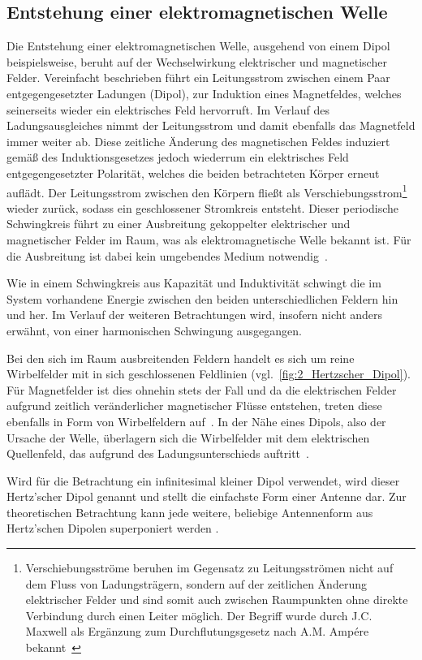 
\subsection{Entstehung einer elektromagnetischen Welle}\label{cha:2_sub_Entstehung_einer_Welle}

Die Entstehung einer elektromagnetischen Welle, ausgehend von einem Dipol beispielsweise, beruht auf der Wechselwirkung elektrischer und magnetischer Felder. Vereinfacht beschrieben führt ein Leitungsstrom zwischen einem Paar entgegengesetzter Ladungen (Dipol), zur Induktion eines Magnetfeldes, welches seinerseits wieder ein elektrisches Feld hervorruft. Im Verlauf des Ladungsausgleiches nimmt der Leitungsstrom und damit ebenfalls das Magnetfeld immer weiter ab. Diese zeitliche Änderung des magnetischen Feldes induziert gemäß des Induktionsgesetzes jedoch wiederrum ein elektrisches Feld entgegengesetzter Polarität, welches die beiden betrachteten Körper erneut auflädt. Der Leitungsstrom zwischen den Körpern fließt als Verschiebungsstrom\footnote{Verschiebungsströme beruhen im Gegensatz zu Leitungsströmen nicht auf dem Fluss von Ladungsträgern, sondern auf der zeitlichen Änderung elektrischer Felder und sind somit auch zwischen Raumpunkten ohne direkte Verbindung durch einen Leiter möglich. Der Begriff wurde durch J.C. Maxwell als Ergänzung zum Durchflutungsgesetz nach A.M. Ampére bekannt~\cite{Feldtheorie_Begriffe}} wieder zurück, sodass ein geschlossener Stromkreis entsteht. Dieser periodische Schwingkreis führt zu einer Ausbreitung gekoppelter elektrischer und magnetischer Felder im Raum, was als elektromagnetische Welle bekannt ist. Für die Ausbreitung ist dabei kein umgebendes Medium notwendig~\cite{EM_Schirmung}.
\par
\vspace{\linespace}
Wie in einem Schwingkreis aus Kapazität und Induktivität schwingt die im System vorhandene Energie zwischen den beiden unterschiedlichen Feldern hin und her. Im Verlauf der weiteren Betrachtungen wird, insofern nicht anders erwähnt, von einer harmonischen Schwingung ausgegangen.
\par
\vspace{\linespace}
Bei den sich im Raum ausbreitenden Feldern handelt es sich um reine Wirbelfelder mit in sich geschlossenen Feldlinien \cite{Feldtheorie_Begriffe} (vgl.~\Abb\ref{fig:2_Hertzscher_Dipol}). Für Magnetfelder ist dies ohnehin stets der Fall und da die elektrischen Felder aufgrund zeitlich veränderlicher magnetischer Flüsse entstehen, treten diese ebenfalls in Form von Wirbelfeldern auf~\cite{EM_Schirmung, Feldtheorie_Begriffe}. In der Nähe eines Dipols, also der Ursache der Welle, überlagern sich die Wirbelfelder mit dem elektrischen Quellenfeld, das aufgrund des Ladungsunterschieds auftritt~\cite{EM_Schirmung}. 
\par
\vspace{\linespace}
Wird für die Betrachtung ein infinitesimal kleiner Dipol verwendet, wird dieser Hertz'scher Dipol genannt und stellt die einfachste Form einer Antenne dar. Zur theoretischen Betrachtung kann jede weitere, beliebige Antennenform aus Hertz'schen Dipolen superponiert werden \cite{EM_Schirmung}.

